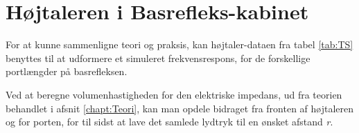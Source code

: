 \section{Højtaleren i Basrefleks-kabinet}

For at kunne sammenligne teori og praksis, kan højtaler-dataen fra tabel \ref{tab:TS} benyttes til at udformere et simuleret frekvensrespons, for de forskellige portlængder på basrefleksen.

Ved at beregne volumenhastigheden for den elektriske impedans, ud fra teorien behandlet i afsnit \ref{chapt:Teori}, kan man opdele bidraget fra fronten af højtaleren og for porten, for til sidst at lave det samlede lydtryk til en ønsket afstand \textit{r}. 












